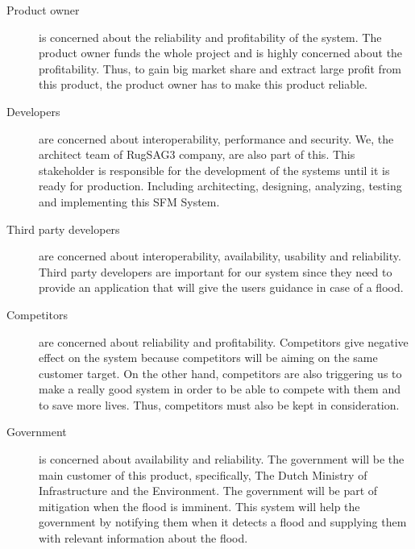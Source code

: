 
\begin{description}
\item[Product owner] is concerned about the reliability and profitability of the system. The product owner funds the whole project and is highly concerned about the profitability. Thus, to gain big market share and extract large profit from this product, the product owner has to make this product reliable.
 
\item[Developers] are concerned about interoperability, performance and security. We, the architect team of RugSAG3 company, are also part of this. This stakeholder is responsible for the development of the systems until it is ready for production. Including architecting, designing, analyzing, testing and implementing this SFM System.

\item[Third party developers] are concerned about interoperability, availability, usability and reliability. Third party developers are important for our system since they need to provide an application that will give the users guidance in case of a flood.

\item[Competitors] are concerned about reliability and profitability. Competitors give negative effect on the system because competitors will be aiming on the same customer target. On the other hand, competitors are also triggering us to make a really good system in order to be able to compete with them and to save more lives. Thus, competitors must also be kept in consideration.

\item[Government] is concerned about availability and reliability. The government will be the main customer of this product, specifically, The Dutch Ministry of Infrastructure and the Environment. The government will be part of mitigation when the flood is imminent. This system will help the government by notifying them when it detects a flood and supplying them with relevant information about the flood.


\end{description}
